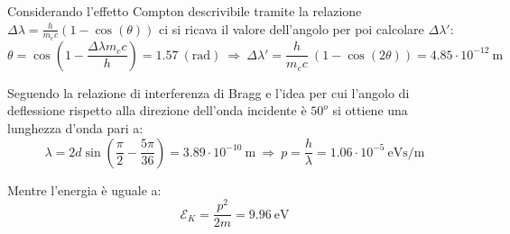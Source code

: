 \documentclass[12pt,twoside,a4]{article}
\begin{document}
\begin{solution}
	Considerando l'effetto Compton descrivibile tramite la relazione $\Delta \lambda = \frac{h}{m_e c } (1-\cos{(\theta)})$ ci si ricava il valore dell'angolo per poi calcolare $\Delta \lambda'$: \begin{equation*}
     \theta = \cos{\left(1- \frac{\Delta \lambda m_e c}{h}\right)} = 1.57 \ \mathrm{(rad)}  \  \Rightarrow  \   \Delta \lambda' = \frac{h}{m_e c} \ (1 - \cos{(2\theta)}) = 4.85 \cdot 10^{-12} \ \mathrm{m}   
 \end{equation*}
\end{solution}





\begin{solution}
	Seguendo la relazione di interferenza di Bragg e l'idea per cui l'angolo di deflessione rispetto alla direzione dell'onda incidente è $50^o$ si ottiene una lunghezza d'onda pari a: \begin{equation*}
\lambda = 2 d \sin{\left(\frac{\pi}{2} - \frac{5 \pi}{36}\right)} = 3.89 \cdot 10^{-10} \ \mathrm{m}   \  \Rightarrow  \  p = \frac{h}{\lambda} = 1.06 \cdot 10^{-5} \ \mathrm{eV s/m}  
\end{equation*}

 Mentre l'energia è uguale a: \begin{equation*}
\mathcal{E}_K = \frac{p^2}{2 m} =  9.96 \ \mathrm{eV}    
 \end{equation*}
\end{solution}


\newpage
\end{document}
